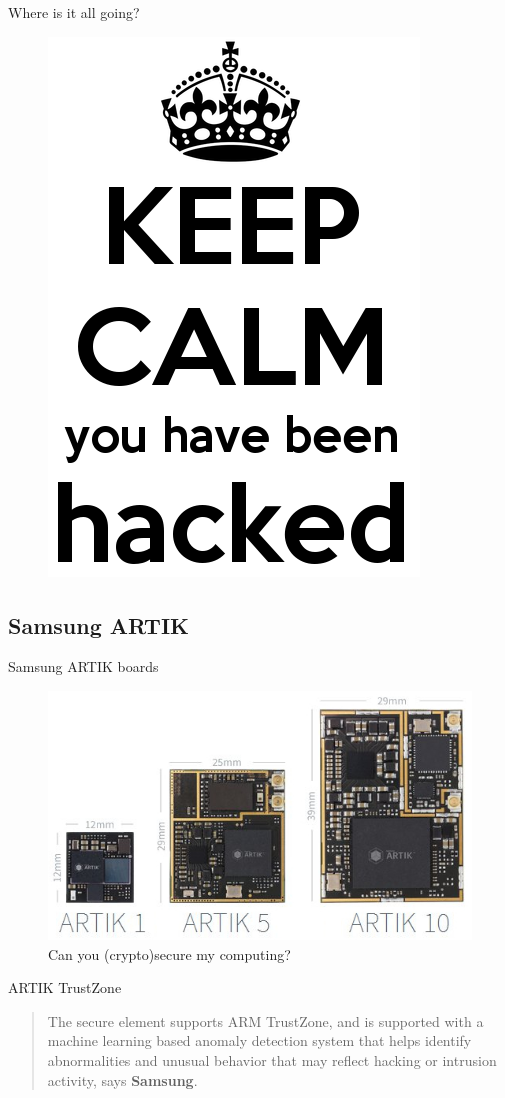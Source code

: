 \documentclass[hyperref={unicode}]{beamer}
\begin{document}
\begin{frame}{Where is it all going?}
	\begin{figure}
	\includegraphics[width=.4\textwidth]{hacked.png}
	\end{figure}
\end{frame}

\subsection{Samsung ARTIK}


\begin{frame}{Samsung ARTIK boards}
	\begin{figure}
	\includegraphics[width=.8\textwidth]{samsung-artik.jpg}
	\caption{Can you (crypto)secure my computing?}
	\end{figure}
\end{frame}

\begin{frame}{ARTIK TrustZone}
	\begin{quote}
	The secure element supports ARM TrustZone, and is supported with a machine learning based anomaly detection system that helps identify abnormalities and unusual behavior that may reflect hacking or intrusion activity, says \textbf{Samsung}.
	\end{quote}

\end{frame}
\end{document}
